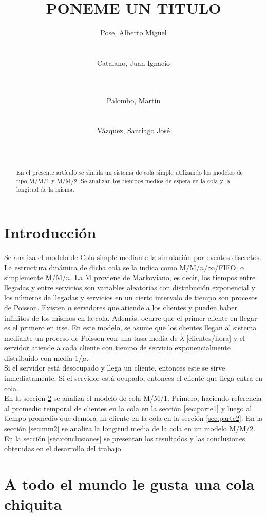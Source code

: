 \documentclass{sig-alternate}
\title{PONEME UN TITULO}
\author{
\alignauthor
Pose, Alberto Miguel\\
       \affaddr{Instituto Tecnol\'ogico de Buenos Aires}\\
       \affaddr{Buenos Aires, Argentina}\\
       \email{apose@alu.itba.edu.ar}
\alignauthor
Catalano, Juan Ignacio\\
       \affaddr{Instituto Tecnol\'ogico de Buenos Aires}\\
       \affaddr{Buenos Aires, Argentina}\\
       \email{jcatalan@alu.itba.edu.ar}
\and
\alignauthor 
Palombo, Mart\'in\\
       \affaddr{Instituto Tecnol\'ogico de Buenos Aires}\\
       \affaddr{Buenos Aires, Argentina}\\
       \email{mpalombo@alu.itba.edu.ar}
\alignauthor 
V\'azquez, Santiago Jos\'e\\
       \affaddr{Instituto Tecnol\'ogico de Buenos Aires}\\
       \affaddr{Buenos Aires, Argentina}\\
       \email{savazque@alu.itba.edu.ar}
}
\date{}
\begin{document}
\maketitle

\begin{abstract}

En el presente art\'iculo se simula un sistema de cola simple utilizando los modelos de tipo M/M/1 y M/M/2.
Se analizan los tiempos medios de espera en la cola y la longitud de la misma.
\end{abstract}

\newpage

\section{Introducci\'on}

Se analiza el modelo de Cola simple mediante la simulaci\'on por eventos discretos.
La estructura din\'amica de dicha cola se la indica como M/M/$n$/$\infty$/FIFO, o simplemente M/M/$n$.
La M proviene de Markoviano, es decir, los tiempos entre llegadas y entre servicios son variables
aleatorias con distribuci\'on exponencial y los n\'umeros de llegadas y servicios en un cierto
intervalo de tiempo son procesos de Poisson.  Existen $n$ servidores que atiende a los clientes
y pueden haber infinitos de los mismos en la cola. Adem\'as, ocurre que el primer cliente en llegar es el primero en irse.
En este modelo, se asume que los clientes llegan al sistema mediante un proceso de Poisson con una tasa
media de $\lambda$ [clientes/hora] y el servidor atiende a cada cliente con tiempo de servicio exponencialmente
distribuido con media 1/$\mu$. \\
Si el servidor est\'a desocupado y llega un cliente, entonces este se sirve inmediatamente. Si el servidor est\'a
ocupado, entonces el cliente que llega entra en cola. \\
En la secci\'on \ref{sec:mm1} se analiza el modelo de cola M/M/1. Primero, haciendo referencia al
promedio temporal de clientes en la cola en la secci\'on \ref{sec:parte1} y luego
al tiempo promedio que demora un cliente en la cola en la secci\'on \ref{sec:parte2}.
En la secci\'on \ref{sec:mm2} se analiza la longitud media de la cola en un modelo M/M/2.
En la secci\'on \ref{sec:conclusiones} se presentan los resultados y las conclusiones obtenidas en el desarrollo del trabajo.
\section{A todo el mundo le gusta una cola chiquita}
\label{sec:mm1}
\end{document}
